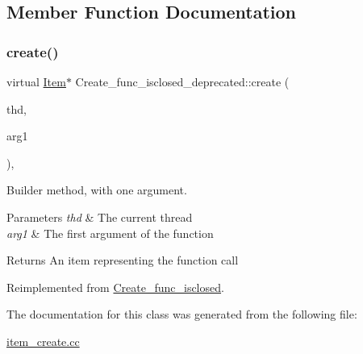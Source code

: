 \subsection{Member Function Documentation}
\mbox{\label{classCreate__func__isclosed__deprecated_a9db69e516a3c72b229cc4fe0660adad8}} 
\subsubsection{\texorpdfstring{create()}{create()}}
{\footnotesize\ttfamily virtual \mbox{\hyperlink{classItem}{Item}}$\ast$ Create\+\_\+func\+\_\+isclosed\+\_\+deprecated\+::create (\begin{DoxyParamCaption}\item[{T\+HD $\ast$}]{thd,  }\item[{\mbox{\hyperlink{classItem}{Item}} $\ast$}]{arg1 }\end{DoxyParamCaption})\hspace{0.3cm}{\ttfamily [inline]}, {\ttfamily [virtual]}}

Builder method, with one argument. 
\begin{DoxyParams}{Parameters}
{\em thd} & The current thread \\
\hline
{\em arg1} & The first argument of the function \\
\hline
\end{DoxyParams}
\begin{DoxyReturn}{Returns}
An item representing the function call 
\end{DoxyReturn}


Reimplemented from \mbox{\hyperlink{classCreate__func__isclosed_a1df58b5c9845fbf47e2fe5bb6978b428}{Create\+\_\+func\+\_\+isclosed}}.



The documentation for this class was generated from the following file\+:\begin{DoxyCompactItemize}
\item 
\mbox{\hyperlink{item__create_8cc}{item\+\_\+create.\+cc}}\end{DoxyCompactItemize}
